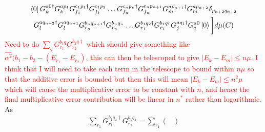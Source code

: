 \documentclass[aps,floatfix,10pt,amssymb,amsfont,amsmath,superscriptaddress,float,nofootinbib,longbibliography,nobalancelastpage,twocolumn]{revtex4-2}
\begin{document}
\begin{widetext}
\begin{multline}
\bra{0}G^{a0\dagger}_kG^{ap_1}_kG^{c_1p_1\dagger}_{f_1}G^{c_1p_2}_{f_1}\ldots G^{c_np_n\dagger}_{f_n}G^{c_np_{n+1}}_{f_n}G^{ap_{n+1}\dagger}_{m}G^{ap_{n+2}}_m \delta_{p_{n+2}q_{n+2}}\\G^{aq_{n+2}\dagger}_l G^{aq_{n+1}}_l G^{b_{n}q_{n+1}\dagger}_{r_n}G^{b_nq_n}_{r_n}\ldots G^{b_1q_2\dagger}_{r_1}G^{b_1q_1}_{r_1}G^{aq_1\dagger}_jG^{a0}_j\ket{0}\bigg]d\mu(C)
\end{multline}
\textcolor{red}{Need to do $\sum_{q}G^{b_1q}_{r_1}G^{b_2q\dagger}_{r_2}$ which should give something like $\hat{\alpha^2} (b_1-b_2-(E_{r_1}-E_{r_2})$, this can then be telescoped to give $|E_k - E_m| \leq n\mu$. I think that I will need to take each term in the telescope to bound within $n\mu$ so that the additive error is bounded but then this will mean $|E_k - E_m| \leq n^2\mu$ which will cause the multiplicative error to be constant with $n$, and hence the final multiplicative error contribution will be linear in $n^*$ rather than logarithmic.}
As
\begin{multline}
    \sum_{r_1}G^{b_1q_2\dagger}_{r_1} G^{b_1q_1}_{r_1} = \sum_{r_1}\begin{pmatrix}

\end{pmatrix}
\end{multline}
\end{widetext}
\end{document}
